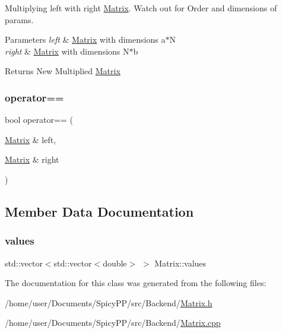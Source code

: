 Multiplying left with right \hyperlink{classMatrix}{Matrix}. Watch out for Order and dimensions of params. 
\begin{DoxyParams}{Parameters}
{\em left} & \hyperlink{classMatrix}{Matrix} with dimensions a$\ast$N \\
\hline
{\em right} & \hyperlink{classMatrix}{Matrix} with dimensions N$\ast$b \\
\hline
\end{DoxyParams}
\begin{DoxyReturn}{Returns}
New Multiplied \hyperlink{classMatrix}{Matrix} 
\end{DoxyReturn}
\mbox{\label{classMatrix_a9407333bda2f3bf7b8a7ca9bec61b8ce}} 
\subsubsection{\texorpdfstring{operator==}{operator==}}
{\footnotesize\ttfamily bool operator== (\begin{DoxyParamCaption}\item[{\hyperlink{classMatrix}{Matrix} \&}]{left,  }\item[{\hyperlink{classMatrix}{Matrix} \&}]{right }\end{DoxyParamCaption})\hspace{0.3cm}{\ttfamily [friend]}}



\subsection{Member Data Documentation}
\mbox{\label{classMatrix_a5987175ae045377790ff0b1f6cfd2e7b}} 
\subsubsection{\texorpdfstring{values}{values}}
{\footnotesize\ttfamily std\+::vector$<$std\+::vector$<$double$>$ $>$ Matrix\+::values\hspace{0.3cm}{\ttfamily [private]}}



The documentation for this class was generated from the following files\+:\begin{DoxyCompactItemize}
\item 
/home/user/\+Documents/\+Spicy\+P\+P/src/\+Backend/\hyperlink{Matrix_8h}{Matrix.\+h}\item 
/home/user/\+Documents/\+Spicy\+P\+P/src/\+Backend/\hyperlink{Matrix_8cpp}{Matrix.\+cpp}\end{DoxyCompactItemize}
